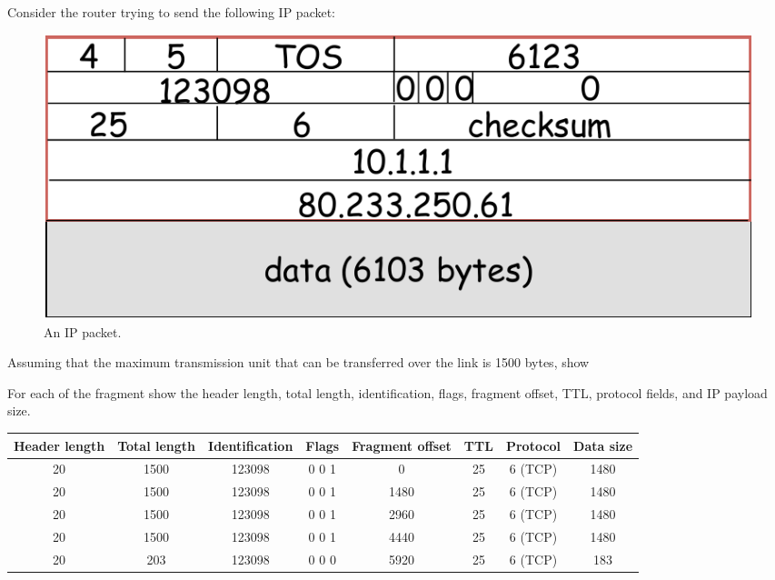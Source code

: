 \documentclass{report}
\begin{document}
\clearpage
\begin{problem}

Consider the router trying to send the following IP packet:

\begin{figure}[!h]
\center
\includegraphics[scale=0.8]{hw6-frag}
\caption{An IP packet.}
\label{fig:ip-frag}
\end{figure}

Assuming that the maximum transmission unit that can be transferred over the link is 1500 bytes, show

For each of the fragment show the header length, total length, identification, flags, fragment offset, TTL, protocol fields, and IP payload size.

\vspace{20px}

\begin{tabular}[h]{|c|c|c|c|c|c|c|c|}
  \hline
  Header length &
  Total length &
  Identification &
  Flags &
  Fragment offset &
  TTL &
  Protocol &
  Data size \\
  \hline
  20 & 1500 & 123098 & 0 0 1 & 0    & 25 & 6 (TCP) & 1480 \\
  20 & 1500 & 123098 & 0 0 1 & 1480 & 25 & 6 (TCP) & 1480 \\
  20 & 1500 & 123098 & 0 0 1 & 2960 & 25 & 6 (TCP) & 1480 \\
  20 & 1500 & 123098 & 0 0 1 & 4440 & 25 & 6 (TCP) & 1480 \\
  20 & 203  & 123098 & 0 0 0 & 5920 & 25 & 6 (TCP) & 183  \\
  \hline
\end{tabular}


\end{problem}
\end{document}
